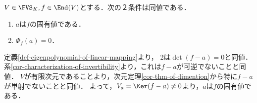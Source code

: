 \documentclass[uplatex, dvipdfmx]{jsreport}
\begin{document}
\begin{proposition}[固有値であることの特徴付け]
    $V\in\FVS_K,f\in\End(V)$とする．次の２条件は同値である．
    \begin{enumerate}
        \item $a$は$f$の固有値である．
        \item $\Phi_f(a)=0$．
    \end{enumerate}
\end{proposition}
\begin{Proof}
    定義\ref{def-eigenpolynomial-of-linear-mapping}より，
    2は$\det(f-a)=0$と同値．系\ref{cor-characterization-of-invertibility}より，これは$f-a$が可逆でないことと同値．
    $V$が有限次元であることより，次元定理\ref{cor-thm-of-dimention}から特に$f-a$が単射でないことと同値．
    よって，$V_a=\Ker(f-a)\ne 0$より，$a$は$f$の固有値である．
\end{Proof}
\end{document}
